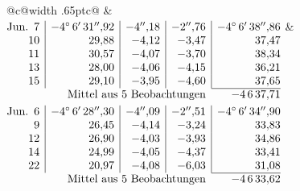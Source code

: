 \noindent\begin{tabular}{@{}c@{\hspace{.4em}\vrule width .65pt\hspace{.4em}}c@{}}
 &
 \\[.18ex]
\(\begin{array}[t]{@{}r|r|r|r|r@{}}
\text{Jun.}\enspace 7 & -4^\circ\,6'\,31''{,}92 & -4''{,}18 & -2''{,}76 & -4^\circ\,6'\,38''{,}86\\
10 & 29{,}88 & -4{,}12 & -3{,}47 & 37{,}47\\
11 & 30{,}57 & -4{,}07 & -3{,}70 & 38{,}34\\
13 & 28{,}00 & -4{,}06 & -4{,}15 & 36{,}21\\
15 & 29{,}10 & -3{,}95 & -4{,}60 & 37{,}65\\
\cline{5-5}
\multicolumn{4}{r}{\text{Mittel aus 5 Beobachtungen}} & -4\,6\,37{,}71
\end{array}\)
&
\(\begin{array}[t]{@{}r|r|r|r|r@{}}
\text{Jun.}\enspace 6 & -4^\circ\,6'\,28''{,}30 & -4''{,}09 & -2''{,}51 & -4^\circ\,6'\,34''{,}90\\
9 & 26{,}45 & -4{,}14 & -3{,}24 & 33{,}83\\
12 & 26{,}90 & -4{,}03 & -3{,}93 & 34{,}86\\
14 & 24{,}99 & -4{,}05 & -4{,}37 & 33{,}41\\
22 & 20{,}97 & -4{,}08 & -6{,}03 & 31{,}08\\
\cline{5-5}
\multicolumn{4}{r}{\text{Mittel aus 5 Beobachtungen}} & -4\,6\,33{,}62
\end{array}\)
\end{tabular}\par\medskip
{}
